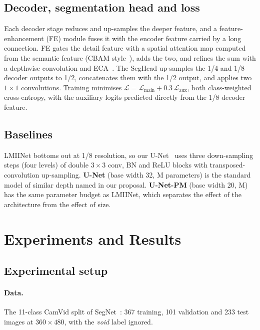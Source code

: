 \documentclass{article}
\begin{document}
\subsection{Decoder, segmentation head and loss}
\label{sec:decoder}
Each decoder stage reduces and up-samples the deeper feature, and a feature-enhancement (FE)
module fuses it with the encoder feature carried by a long connection. FE gates the detail
feature with a spatial attention map computed from the semantic feature (CBAM
style~\cite{woo2018cbam}), adds the two, and refines the sum with a depthwise convolution and
ECA~\cite{wang2020eca}. The SegHead up-samples the 1/4 and 1/8 decoder outputs to 1/2,
concatenates them with the 1/2 output, and applies two $1{\times}1$ convolutions. Training
minimises $\mathcal{L} = \mathcal{L}_{\text{main}} + 0.3\,\mathcal{L}_{\text{aux}}$, both
class-weighted cross-entropy, with the auxiliary logits predicted directly from the 1/8 decoder
feature.

\subsection{Baselines}
\label{sec:baselines}
LMIINet bottoms out at 1/8 resolution, so our U-Net~\cite{ronneberger2015unet} uses three
down-sampling steps (four levels) of double $3{\times}3$ conv, BN and ReLU blocks with
transposed-convolution up-sampling. \textbf{U-Net} (base width 32, \UnetParams{}M parameters) is the
standard model of similar depth named in our proposal. \textbf{U-Net-PM} (base width 20,
\UnetPmParams{}M) has the same parameter budget as LMIINet, which separates the effect of the
architecture from the effect of size.

\section{Experiments and Results}
\label{sec:results}

\subsection{Experimental setup}
\label{sec:setup}

\paragraph{Data.} The 11-class CamVid split of SegNet~\cite{badrinarayanan2017segnet}: 367 training,
101 validation and 233 test images at $360{\times}480$, with the \emph{void} label ignored.
\end{document}
